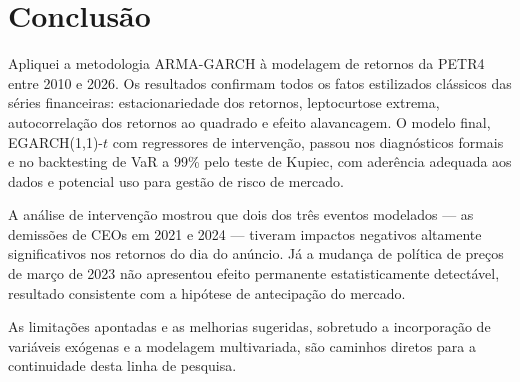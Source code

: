 \documentclass[12pt, a4paper]{article}
\begin{document}
\section{Conclusão}
\label{sec:conc}

Apliquei a metodologia ARMA-GARCH à modelagem de retornos da PETR4 entre 2010 e 2026. Os resultados confirmam todos os fatos estilizados clássicos das séries financeiras: estacionariedade dos retornos, leptocurtose extrema, autocorrelação dos retornos ao quadrado e efeito alavancagem. O modelo final, EGARCH(1,1)-$t$ com regressores de intervenção, passou nos diagnósticos formais e no backtesting de VaR a 99\% pelo teste de Kupiec, com aderência adequada aos dados e potencial uso para gestão de risco de mercado.

A análise de intervenção mostrou que dois dos três eventos modelados --- as demissões de CEOs em 2021 e 2024 --- tiveram impactos negativos altamente significativos nos retornos do dia do anúncio. Já a mudança de política de preços de março de 2023 não apresentou efeito permanente estatisticamente detectável, resultado consistente com a hipótese de antecipação do mercado.

As limitações apontadas e as melhorias sugeridas, sobretudo a incorporação de variáveis exógenas e a modelagem multivariada, são caminhos diretos para a continuidade desta linha de pesquisa.
\end{document}
